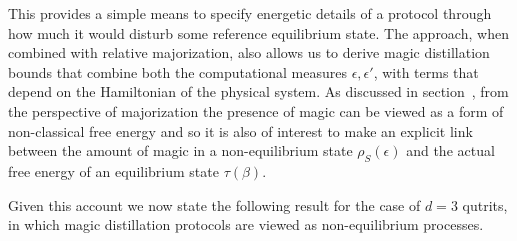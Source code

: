 \documentclass[pra,
aps,
twocolumn,
superscriptaddress,
groupedaddress,
nofootinbib,
reprint
]{revtex4-1}
\begin{document}
This provides a simple means to specify energetic details of a protocol through how much it would disturb some reference equilibrium state. The approach, when combined with relative majorization, also allows us to derive magic distillation bounds that combine both the computational measures $\epsilon,\epsilon'$, with terms that depend on the Hamiltonian of the physical system. As discussed in section~, from the perspective of majorization the presence of magic can be viewed as a form of non-classical free energy and so it is also of interest to make an explicit link between the amount of magic in a non-equilibrium state $\rho_S(\epsilon)$ and the actual free energy of an equilibrium state $\tau(\beta)$. 

Given this account we now state the following result for the case of $d=3$ qutrits, in which magic distillation protocols are viewed as non-equilibrium processes.
\end{document}
